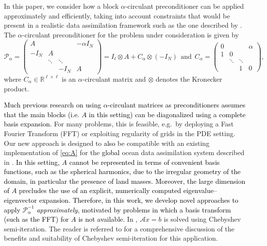 \documentclass{article}
\newcommand{\aw}{\textcolor{black}}%
\newcommand{\jt}{\textcolor{black}}%
\newcommand{\sizeA}{N}
\theoremstyle{definition}
\begin{document}
	
	In this paper, we consider how a block $\alpha$-circulant preconditioner 
	can be applied approximately and efficiently, taking into account constraints that would be present in a realistic data assimilation framework such as the one described by \cite{weaver2018time}. The $\alpha$-circulant preconditioner for the problem under consideration is given by 
	\begin{equation}\label{eq:exactPBE}
		\mathcal{P}_{\alpha} = \begin{pmatrix}
			{A} && &-{ \alpha}I_\sizeA \\
			-I_\sizeA & {A} \\
			& \ddots & \ddots \\
			&& -I_\sizeA & {A}
		\end{pmatrix} = I_{\ell} \otimes {A} + C_{\alpha} \otimes(-I_\sizeA)
		~~ \textrm{and}
		~~ C_{\alpha} = 
		\begin{pmatrix}
			0 & & & \alpha \\
			1 & 0 & & \\
			& \ddots & \ddots & \\
			& & 1 & 0
		\end{pmatrix},
	\end{equation}
	where $ C_{\alpha} \in \mathbb{R}^{\ell \times \ell}$ is an {$\alpha$-}circulant matrix and $\otimes$ denotes the Kronecker product.
	
	
	
	\aw{Much previous research on using $\alpha$-circulant matrices as preconditioners assumes that the main blocks (i.e. ${A}$ in this setting) can be diagonalized using a complete basis expansion.}
	For many problems, this is feasible, e.g.~by deploying a Fast Fourier Transform (FFT) or exploiting regularity of grids in the PDE setting. 
	Our new approach is designed to \jt{also} be compatible with an existing implementation of \eqref{eq:A} for the \jt{global} ocean data assimilation system described in \cite{weaver2018time}. 
	\jt{In this setting, ${A}$ cannot be represented in terms of convenient basis functions, such as the spherical harmonics, due to the irregular geometry of the domain, in particular the presence of land masses. Moreover, the large dimension of ${A}$ precludes the use of an explicit, numerically computed eigenvalue--eigenvector expansion.}
	\jt{Therefore, in this work, we develop novel approaches to apply  $\mathcal{P}_{\alpha}^{-1}$ \textit{approximately}, motivated by problems in which a basis transform (such as the FFT) for ${A}$ is not available.}
	In \cite{weaver_correlation_2016}, $\mathcal{A}x = b$ is solved using Chebyshev semi-iteration. The reader is referred to \cite{weaver2018time,weaver_correlation_2016} for a comprehensive discussion of the benefits and suitability of Chebyshev semi-iteration for this application. 
	
\end{document}
